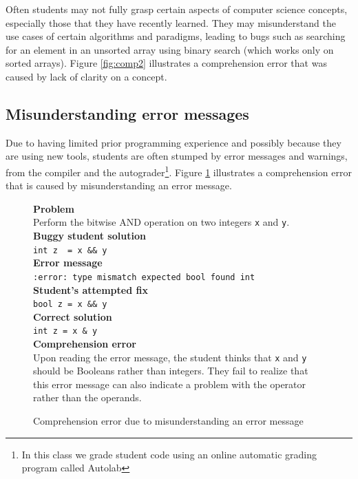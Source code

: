 \documentclass{sig-alternate}
\begin{document}
Often students may not fully grasp certain aspects of computer science
concepts, especially those that they have recently learned. They may
misunderstand the use cases of certain algorithms and paradigms,
leading to bugs such as searching for an element in an unsorted array
using binary search (which works only on sorted arrays). Figure
\ref{fig:comp2} illustrates a comprehension error that was caused by
lack of clarity on a concept.




\subsection{Misunderstanding error messages}

Due to having limited prior programming experience and possibly
because they are using new tools, students are often stumped by error
messages and warnings, from the compiler and the
autograder\footnote{In this class we grade student code using an
online automatic grading program called Autolab}. Figure
\ref{fig:comp3} illustrates a comprehension error that is caused by
misunderstanding an error message.


\begin{figure}
\begin{framed}
\setlength{\parindent}{0cm}
\textbf{Problem} \\
Perform the bitwise AND operation on two integers \texttt{x} and \texttt{y}.\\

\textbf{Buggy student solution} \\
\verb|int z  = x && y|\\

\textbf{Error message}\\
\texttt{:error: type mismatch expected bool found int}\\

\textbf{Student's attempted fix}\\
\verb|bool z = x && y|\\

\textbf{Correct solution}\\
\verb|int z = x & y|\\

\textbf{Comprehension error}\\

Upon reading the error message, the student thinks that \texttt{x} and
\texttt{y} should be Booleans rather than integers. They fail to
realize that this error message can also indicate a problem with the
operator rather than the operands.

\end{framed}
\vspace{-0.1in}
\caption{Comprehension error due to misunderstanding an error message}
\label{fig:comp3}
\end{figure}
\end{document}
